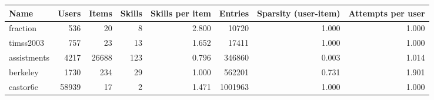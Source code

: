 \begin{tabular}{lrrrrrrr}
\toprule
         Name &  Users &  Items &  Skills &  Skills per item &  Entries &  Sparsity (user-item) &  Attempts per user \\
\midrule
     fraction &    536 &     20 &       8 &            2.800 &    10720 &                  1.000 &              1.000 \\
    timss2003 &    757 &     23 &      13 &            1.652 &    17411 &                  1.000 &              1.000 \\
  assistments &   4217 &  26688 &     123 &            0.796 &   346860 &                  0.003 &              1.014 \\
     berkeley &   1730 &    234 &      29 &            1.000 &   562201 &                  0.731 &              1.901 \\
     castor6e &  58939 &     17 &       2 &            1.471 &  1001963 &                  1.000 &              1.000 \\
\bottomrule
\end{tabular}
